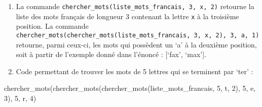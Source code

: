 \documentclass[
  letterpaper,
  DIV=11,
  numbers=noendperiod]{scrartcl}
\newenvironment{Shaded}{\begin{snugshade}}{\end{snugshade}}
\newcommand{\DecValTok}[1]{\textcolor[rgb]{0.68,0.00,0.00}{#1}}
\newcommand{\NormalTok}[1]{\textcolor[rgb]{0.00,0.23,0.31}{#1}}
\newcommand{\StringTok}[1]{\textcolor[rgb]{0.13,0.47,0.30}{#1}}
\begin{document}
\begin{enumerate}
  \begin{enumerate}
  \def\labelenumii{\alph{enumii}.}
  \setcounter{enumii}{1}
  \item
    La commande
    \texttt{chercher\_mots(liste\_mots\_francais,\ 3,\ \textquotesingle{}x\textquotesingle{},\ 2)}
    retourne la liste des mots français de longueur 3 contenant la
    lettre \texttt{x} à la troisième position. La commande
    \texttt{chercher\_mots(chercher\_mots(liste\_mots\_francais,\ 3,\ \textquotesingle{}x\textquotesingle{},\ 2),\ 3,\ \textquotesingle{}a\textquotesingle{},\ 1)}
    retourne, parmi ceux-ci, les mots qui possèdent un `a' à la deuxième
    position, soit à partir de l'exemple donné dans l'énoncé : {[}`fax',
    `max'{]}.
  \item
    Code permettant de trouver les mots de 5 lettres qui se terminent
    par `ter' :
  \end{enumerate}

\begin{Shaded}
\begin{Highlighting}[]
\NormalTok{chercher\_mots(chercher\_mots(chercher\_mots(liste\_mots\_francais, }\DecValTok{5}\NormalTok{, }\StringTok{\textquotesingle{}t\textquotesingle{}}\NormalTok{, }\DecValTok{2}\NormalTok{), }\DecValTok{5}\NormalTok{, }\StringTok{\textquotesingle{}e\textquotesingle{}}\NormalTok{, }\DecValTok{3}\NormalTok{), }\DecValTok{5}\NormalTok{, }\StringTok{\textquotesingle{}r\textquotesingle{}}\NormalTok{, }\DecValTok{4}\NormalTok{)}
\end{Highlighting}
\end{Shaded}
\end{enumerate}
\end{document}
